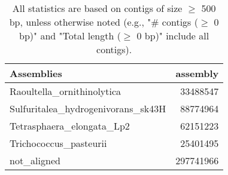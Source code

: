 \documentclass[12pt,a4paper]{article}
\begin{document}
\begin{table}[ht]
\begin{center}
\caption{All statistics are based on contigs of size $\geq$ 500 bp, unless otherwise noted (e.g., "\# contigs ($\geq$ 0 bp)" and "Total length ($\geq$ 0 bp)" include all contigs).}
\begin{tabular}{|l*{1}{|r}|}
\hline
Assemblies & assembly \\ \hline
Raoultella\_ornithinolytica & 33488547 \\ \hline
Sulfuritalea\_hydrogenivorans\_sk43H & 88774964 \\ \hline
Tetrasphaera\_elongata\_Lp2 & 62151223 \\ \hline
Trichococcus\_pasteurii & 25401495 \\ \hline
not\_aligned & 297741966 \\ \hline
\end{tabular}
\end{center}
\end{table}
\end{document}
